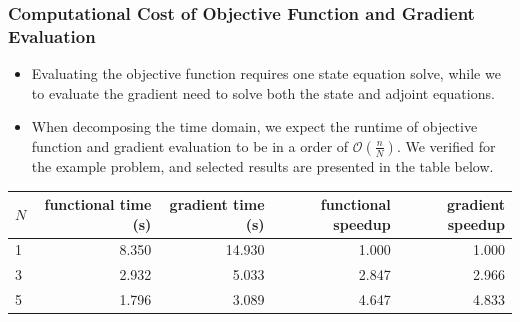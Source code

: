 \documentclass[9pt]{beamer}
\begin{document}
\begin{frame}
\frametitle{Computational Cost of Objective Function and Gradient Evaluation}
\begin{itemize}
\item{Evaluating the objective function requires one state equation solve, while we to evaluate the gradient need to solve both the state and adjoint equations.}
\item{When decomposing the time domain, we expect the runtime of objective function and gradient evaluation to be in a order of $\mathcal{O}(\frac{n}{N})$. We verified for the example problem, and selected results are presented in the table below. }
\end{itemize}
\begin{table}[!h]
\centering
\begin{tabular}{lrrrr}
\toprule
{}$N$ &  functional time (s) &  gradient time (s) &  functional speedup &  gradient speedup \\
\midrule
1 &           8.350 &         14.930 &            1.000 &          1.000 \\
3 &           2.932 &          5.033 &            2.847 &          2.966 \\
5 &           1.796 &          3.089 &            4.647 &          4.833 \\
\bottomrule
\end{tabular}
\end{table}
\end{frame}
\end{document}
